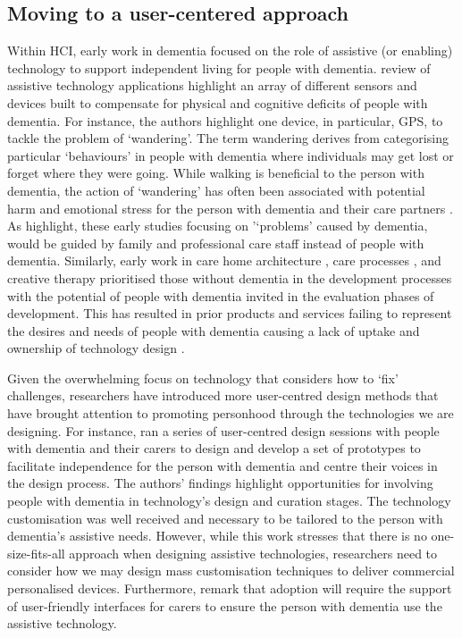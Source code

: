 \subsection{Moving to a user-centered approach}
\label{BL:Tech}
Within HCI, early work in dementia focused on the role of assistive (or enabling) technology to support independent living for people with dementia. \cite{bharucha2009intelligent} review of assistive technology applications highlight an array of different sensors and devices built to compensate for physical and cognitive deficits of people with dementia. For instance, the authors highlight one device, in particular, GPS, to tackle the problem of `wandering'. The term wandering derives from categorising particular `behaviours' in people with dementia where individuals may get lost or forget where they were going. While walking is beneficial to the person with dementia, the action of `wandering' has often been associated with potential harm and emotional stress for the person with dementia and their care partners \citep{robinson2007balancing}. As \cite{bharucha2009intelligent} highlight, these early studies focusing on '`problems' caused by dementia, would be guided by family and professional care staff instead of people with dementia. Similarly, early work in care home architecture \citep{torrington2006has}, care processes \citep{rabins2006practical}, and creative therapy \citep{schmitt2006creative} prioritised those without dementia in the development processes with the potential of people with dementia invited in the evaluation phases of development. This has resulted in prior products and services failing to represent the desires and needs of people with dementia causing a lack of uptake and ownership of technology design \citep{gibson2019personalisation}. 

Given the overwhelming focus on technology that considers how to `fix' challenges, researchers have introduced more user-centred design methods that have brought attention to promoting personhood through the technologies we are designing. For instance, \cite{robinson2009keeping} ran a series of user-centred design sessions with people with dementia and their carers to design and develop a set of prototypes to facilitate independence for the person with dementia and centre their voices in the design process. The authors' findings highlight opportunities for involving people with dementia in technology's design and curation stages. The technology customisation was well received and necessary to be tailored to the person with dementia's assistive needs. However, while this work stresses that there is no one-size-fits-all approach when designing assistive technologies, researchers need to consider how we may design mass customisation techniques to deliver commercial personalised devices. Furthermore, \cite{robinson2009keeping} remark that adoption will require the support of user-friendly interfaces for carers to ensure the person with dementia use the assistive technology. 

